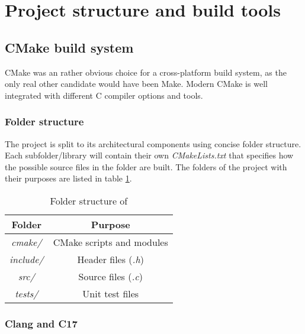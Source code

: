 \section{Project structure and build tools}

\subsection{CMake build system}

CMake was an rather obvious choice for a cross-platform build system, as the
only real other candidate would have been Make. Modern CMake is well integrated
with different C compiler options and tools.

\subsubsection{Folder structure}

The \pman project is split to its architectural components using concise
folder structure. Each subfolder/library will contain their own \textit{CMakeLists.txt}
that specifies how the possible source files in the folder are built. The folders
of the project with their purposes are listed in table \ref{tab:folder}.

\begin{table}[h]
    \centering
    \begin{tabular}{|c|c|}
        \hline
        Folder & Purpose \\

        \hline
        \textit{cmake/} & CMake scripts and modules \\

        \hline
        \textit{include/} & Header files (\textit{.h}) \\

        \hline
        \textit{src/} & Source files (\textit{.c}) \\

        \hline
        \textit{tests/} & Unit test files \\

        \hline
    \end{tabular}
    \caption{Folder structure of \pman}
    \label{tab:folder}
\end{table}

\subsubsection{Clang and C17}

